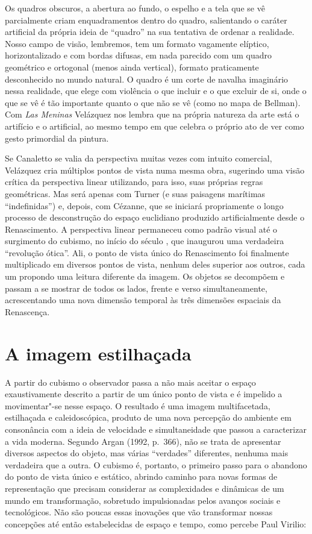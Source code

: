Os quadros obscuros, a abertura ao fundo, o espelho e a tela que se vê
parcialmente criam enquadramentos dentro do quadro, salientando o
caráter artificial da própria ideia de ``quadro'' na sua tentativa de
ordenar a realidade. Nosso campo de visão, lembremos, tem um formato
vagamente elíptico, horizontalizado e com bordas difusas, em nada
parecido com um quadro geométrico e ortogonal (menos ainda vertical),
formato praticamente desconhecido no mundo natural. O quadro é um corte
de navalha imaginário nessa realidade, que elege com violência o que
incluir e o que excluir de si, onde o que se vê é tão importante quanto
o que não se vê (como no mapa de Bellman). Com \emph{Las Meninas}
Velázquez nos lembra que na própria natureza da arte está o artifício e
o artificial, ao mesmo tempo em que celebra o próprio ato de ver como
gesto primordial da pintura.

Se Canaletto se valia da perspectiva muitas vezes com intuito comercial,
Velázquez cria múltiplos pontos de vista numa mesma obra, sugerindo uma
visão crítica da perspectiva linear utilizando, para isso, suas próprias
regras geométricas. Mas será apenas com Turner (e suas paisagens
marítimas ``indefinidas'') e, depois, com Cézanne, que se iniciará
propriamente o longo processo de desconstrução do espaço euclidiano
produzido artificialmente desde o Renascimento. A perspectiva linear
permaneceu como padrão visual até o surgimento do cubismo, no início do
século , que inaugurou uma verdadeira ``revolução ótica''. Ali, o
ponto de vista único do Renascimento foi finalmente multiplicado em
diversos pontos de vista, nenhum deles superior aos outros, cada um
propondo uma leitura diferente da imagem. Os objetos se decompõem e
passam a se mostrar de todos os lados, frente e verso simultaneamente,
acrescentando uma nova dimensão temporal às três dimensões espaciais da
Renascença.

\chapter{A imagem estilhaçada}

A partir do cubismo o observador passa a não mais aceitar o espaço
exaustivamente descrito a partir de um único ponto de vista e é impelido
a movimentar"-se nesse espaço. O resultado é uma imagem multifacetada,
estilhaçada e caleidoscópica, produto de uma nova percepção do ambiente
em consonância com a ideia de velocidade e simultaneidade que passou a
caracterizar a vida moderna. Segundo Argan (1992, p.~366), não se trata
de apresentar diversos aspectos do objeto, mas várias ``verdades''
diferentes, nenhuma mais verdadeira que a outra. O cubismo é, portanto,
o primeiro passo para o abandono do ponto de vista único e estático,
abrindo caminho para novas formas de representação que precisam
considerar as complexidades e dinâmicas de um mundo em transformação,
sobretudo impulsionadas pelos avanços sociais e tecnológicos. Não são
poucas essas inovações que vão transformar nossas concepções até então
estabelecidas de espaço e tempo, como percebe Paul Virilio:

